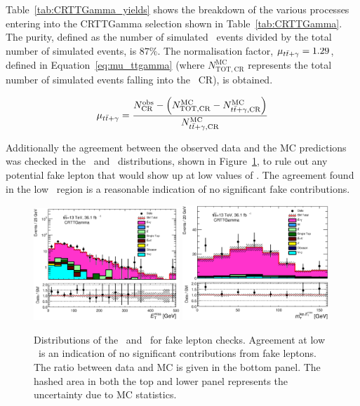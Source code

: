 		Table~\ref{tab:CRTTGamma_yields} shows the breakdown of the various processes entering into the CRTTGamma selection shown in Table~\ref{tab:CRTTGamma}. The purity, defined as the number of simulated \ttgamma\ events divided by the total number of simulated events, is $87\%$. The normalisation factor, $\mu_{t\bar{t}+\gamma} = 1.29$, defined in Equation~\ref{eq:mu_ttgamma} (where $N_{\mathrm{TOT,CR}}^{\mathrm{MC}}$ represents the total number of simulated events falling into the \ttgamma\ \ac{CR}), is obtained. 

		\begin{equation}
			\mu_{t\bar{t}+\gamma} = \frac{ N_{\mathrm{CR}}^{\mathrm{obs}} - \left ( N_{\mathrm{TOT,CR}}^{\mathrm{MC}} - N_{t\bar{t}+\gamma, \mathrm{CR}}^{\mathrm{MC}} \right ) } { N_{t\bar{t}+\gamma,\mathrm{CR}}^{\mathrm{MC}} }
			\label{eq:mu_ttgamma}
		\end{equation}

		Additionally the agreement between the observed data and the \ac{MC} predictions was checked in the \met\ and \mtlepmet\ distributions, shown in Figure~\ref{fig:fakes_check}, to rule out any potential fake lepton that would show up at low values of \mtlepmet. The agreement found in the low \mtlepmet\ region is a reasonable indication of no significant fake contributions.

		\begin{figure}[htbp]
			\begin{center}
				\includegraphics[width=0.49\textwidth]{figures/stop/ttg-int-nonpub/Met_CRTTGamma_withRatio_log}
				\includegraphics[width=0.49\textwidth]{figures/stop/ttg-int-nonpub/MtMetLep_CRTTGamma_withRatio}
				\caption{\label{fig:ttVFakeLepCheck} Distributions of the \met\ and \mtlepmet\ for fake lepton checks. Agreement at low \mtlepmet\ is an indication of no significant contributions from fake leptons. The ratio between data and \ac{MC} is given in the bottom panel. The hashed area in both the top and lower panel represents the uncertainty due to \ac{MC} statistics.}
				\label{fig:fakes_check}
			\end{center}
		\end{figure}

